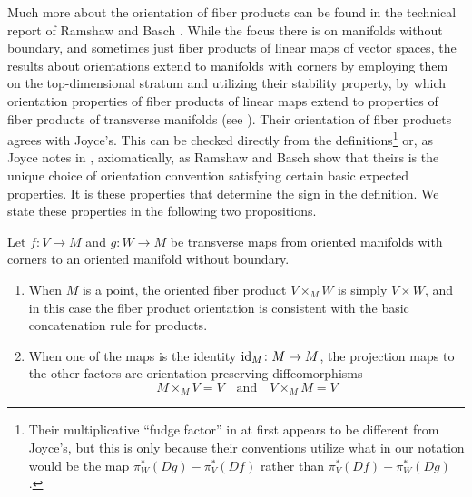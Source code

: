 Much more about the orientation of fiber products can be found in the technical report of Ramshaw and Basch \cite{RamBas09}.
While the focus there is on manifolds without boundary, and sometimes just fiber products of linear maps of vector spaces, the results about orientations extend to manifolds with corners by employing them on the top-dimensional stratum and utilizing their stability property, by which orientation properties of fiber products of linear maps extend to properties of fiber products of transverse manifolds (see \cite[Sections 6.3, 9.1.2, and 9.3]{RamBas09}).
Their orientation of fiber products agrees with Joyce's.
This can be checked directly from the definitions\footnote{Their multiplicative ``fudge factor'' in \cite[Theorem 9.14]{RamBas09} at first appears to be different from Joyce's, but this is only because their conventions utilize what in our notation would be the map $\pi_W^*(Dg)-\pi_V^*(Df)$ rather than $\pi_V^*(Df)-\pi_W^*(Dg)$.} or, as Joyce notes in \cite[Remark 7.6.iii]{Joy12}, axiomatically, as Ramshaw and Basch show that theirs is the unique choice of orientation convention satisfying certain basic expected properties.
It is these properties that determine the sign in the definition.
We state these properties in the following two propositions.

\begin{proposition}\label{P: oriented fiber product basic properties}
	Let $f \colon V \to M$ and $g \colon W \to M$ be transverse maps from oriented manifolds with corners to an oriented manifold without boundary.
	\begin{enumerate}
		\item When $M$ is a point, the oriented fiber product $V \times_M W$ is simply $V \times W$, and in this case the fiber product orientation is consistent with the basic concatenation rule for products.
		\item When one of the maps is the identity $\mathrm{id}_M \colon M \to M$, the projection maps to the other factors are orientation preserving diffeomorphisms
		\begin{equation*}
			M \times_M V = V\quad\text{and}\quad V \times_M M = V
		\end{equation*}
	\end{enumerate}
\end{proposition}

